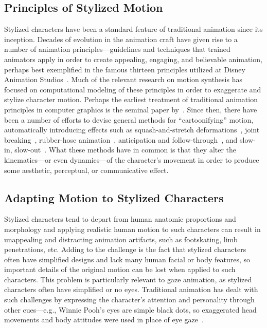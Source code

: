 \subsection{Principles of Stylized Motion}

Stylized characters have been a standard feature of traditional animation since its inception. Decades of evolution in the animation craft have given rise to a number of animation principles---guidelines and techniques that trained animators apply in order to create appealing, engaging, and believable animation, perhaps best exemplified in the famous thirteen principles utilized at Disney Animation Studios~\citep{thomas1981illusion}. Much of the relevant research on motion synthesis has focused on computational modeling of these principles in order to exaggerate and stylize character motion. Perhaps the earliest treatment of traditional animation principles in computer graphics is the seminal paper by~\citet{lasseter1987principles}. Since then, there have been a number of efforts to devise general methods for ``cartoonifying'' motion, automatically introducing effects such as squash-and-stretch deformations~\citep{chenney2002simulating,wang2006filter,kwon2012squash}, joint breaking~\citep{noble2007deform}, rubber-hose animation~\citep{kwon2008exaggerating}, anticipation and follow-through~\citep{choi2004anticipation,wang2006filter,kim2006anticipation}, and slow-in, slow-out~\citep{kwon2011slowin}. What these methods have in common is that they alter the kinematics---or even dynamics---of the character's movement in order to produce some aesthetic, perceptual, or communicative effect.

\subsection{Adapting Motion to Stylized Characters}

Stylized characters tend to depart from human anatomic proportions and morphology and applying realistic human motion to such characters can result in unappealing and distracting animation artifacts, such as footskating, limb penetrations, etc. Adding to the challenge is the fact that stylized characters often have simplified designs and lack many human facial or body features, so important details of the original motion can be lost when applied to such characters. This problem is particularly relevant to gaze animation, as stylized characters often have simplified or no eyes. Traditional animation has dealt with such challenges by expressing the character's attention and personality through other cues---e.g., Winnie Pooh's eyes are simple black dots, so exaggerated head movements and body attitudes were used in place of eye gaze~\citep{thomas1981illusion}.

